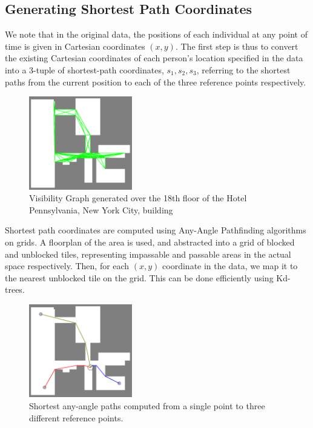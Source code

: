 \documentclass[letterpaper]{article}
\begin{document}
\subsection{Generating Shortest Path Coordinates}

We note that in the original data, the positions of each individual at any point of time is given in Cartesian coordinates $(x,y)$. The first step is thus to convert the existing Cartesian coordinates of each person's location specified in the data into a 3-tuple of shortest-path coordinates, $s_1, s_2, s_3$, referring to the shortest paths from the current position to each of the three reference points respectively.\\

\begin{figure}[!h]
  \centering
    \includegraphics[width=170px]{diagrams/floor18visibilitygraph.png}
  \caption{Visibility Graph generated over the 18th floor of the Hotel Pennsylvania, New York City, building}
  \label{fig:floor18vg}
\end{figure}

Shortest path coordinates are computed using Any-Angle Pathfinding algorithms on grids. A floorplan of the area is used, and abstracted into a grid of blocked and unblocked tiles, representing impassable and passable areas in the actual space respectively. Then, for each $(x,y)$ coordinate in the data, we map it to the nearest unblocked tile on the grid. This can be done efficiently using Kd-trees.\\

\begin{figure}[!h]
  \centering
    \includegraphics[width=170px]{diagrams/floor18shortestpaths.png}
  \caption{Shortest any-angle paths computed from a single point to three different reference points.}
  \label{fig:floor18sps}
\end{figure}
\end{document}
